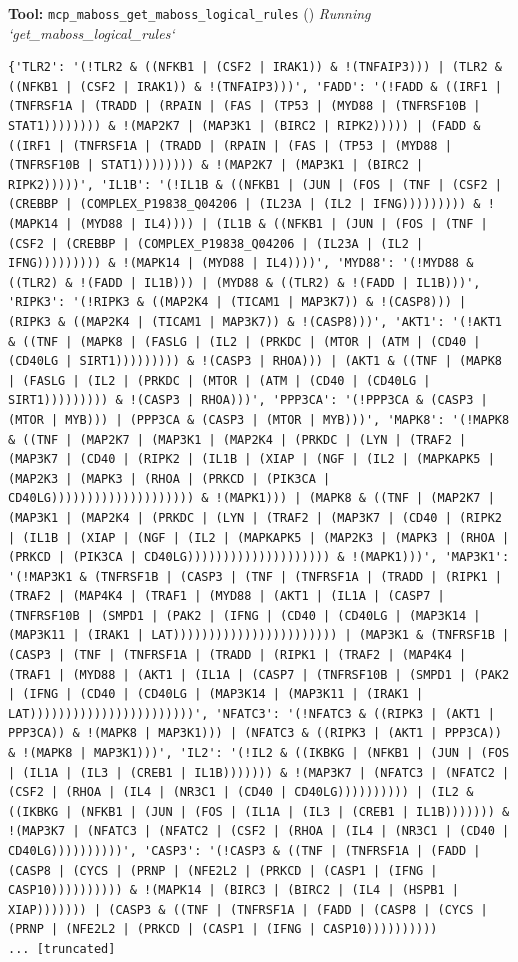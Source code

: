 \documentclass[11pt,a4paper]{article}
\begin{document}
\begin{toolokbox}
\textbf{Tool:} \texttt{mcp\_maboss\_get\_maboss\_logical\_rules} (\checkmark)
\textit{Running `get\_maboss\_logical\_rules`}
\begin{lstlisting}
{'TLR2': '(!TLR2 & ((NFKB1 | (CSF2 | IRAK1)) & !(TNFAIP3))) | (TLR2 & ((NFKB1 | (CSF2 | IRAK1)) & !(TNFAIP3)))', 'FADD': '(!FADD & ((IRF1 | (TNFRSF1A | (TRADD | (RPAIN | (FAS | (TP53 | (MYD88 | (TNFRSF10B | STAT1)))))))) & !(MAP2K7 | (MAP3K1 | (BIRC2 | RIPK2))))) | (FADD & ((IRF1 | (TNFRSF1A | (TRADD | (RPAIN | (FAS | (TP53 | (MYD88 | (TNFRSF10B | STAT1)))))))) & !(MAP2K7 | (MAP3K1 | (BIRC2 | RIPK2)))))', 'IL1B': '(!IL1B & ((NFKB1 | (JUN | (FOS | (TNF | (CSF2 | (CREBBP | (COMPLEX_P19838_Q04206 | (IL23A | (IL2 | IFNG))))))))) & !(MAPK14 | (MYD88 | IL4)))) | (IL1B & ((NFKB1 | (JUN | (FOS | (TNF | (CSF2 | (CREBBP | (COMPLEX_P19838_Q04206 | (IL23A | (IL2 | IFNG))))))))) & !(MAPK14 | (MYD88 | IL4))))', 'MYD88': '(!MYD88 & ((TLR2) & !(FADD | IL1B))) | (MYD88 & ((TLR2) & !(FADD | IL1B)))', 'RIPK3': '(!RIPK3 & ((MAP2K4 | (TICAM1 | MAP3K7)) & !(CASP8))) | (RIPK3 & ((MAP2K4 | (TICAM1 | MAP3K7)) & !(CASP8)))', 'AKT1': '(!AKT1 & ((TNF | (MAPK8 | (FASLG | (IL2 | (PRKDC | (MTOR | (ATM | (CD40 | (CD40LG | SIRT1))))))))) & !(CASP3 | RHOA))) | (AKT1 & ((TNF | (MAPK8 | (FASLG | (IL2 | (PRKDC | (MTOR | (ATM | (CD40 | (CD40LG | SIRT1))))))))) & !(CASP3 | RHOA)))', 'PPP3CA': '(!PPP3CA & (CASP3 | (MTOR | MYB))) | (PPP3CA & (CASP3 | (MTOR | MYB)))', 'MAPK8': '(!MAPK8 & ((TNF | (MAP2K7 | (MAP3K1 | (MAP2K4 | (PRKDC | (LYN | (TRAF2 | (MAP3K7 | (CD40 | (RIPK2 | (IL1B | (XIAP | (NGF | (IL2 | (MAPKAPK5 | (MAP2K3 | (MAPK3 | (RHOA | (PRKCD | (PIK3CA | CD40LG)))))))))))))))))))) & !(MAPK1))) | (MAPK8 & ((TNF | (MAP2K7 | (MAP3K1 | (MAP2K4 | (PRKDC | (LYN | (TRAF2 | (MAP3K7 | (CD40 | (RIPK2 | (IL1B | (XIAP | (NGF | (IL2 | (MAPKAPK5 | (MAP2K3 | (MAPK3 | (RHOA | (PRKCD | (PIK3CA | CD40LG)))))))))))))))))))) & !(MAPK1)))', 'MAP3K1': '(!MAP3K1 & (TNFRSF1B | (CASP3 | (TNF | (TNFRSF1A | (TRADD | (RIPK1 | (TRAF2 | (MAP4K4 | (TRAF1 | (MYD88 | (AKT1 | (IL1A | (CASP7 | (TNFRSF10B | (SMPD1 | (PAK2 | (IFNG | (CD40 | (CD40LG | (MAP3K14 | (MAP3K11 | (IRAK1 | LAT))))))))))))))))))))))) | (MAP3K1 & (TNFRSF1B | (CASP3 | (TNF | (TNFRSF1A | (TRADD | (RIPK1 | (TRAF2 | (MAP4K4 | (TRAF1 | (MYD88 | (AKT1 | (IL1A | (CASP7 | (TNFRSF10B | (SMPD1 | (PAK2 | (IFNG | (CD40 | (CD40LG | (MAP3K14 | (MAP3K11 | (IRAK1 | LAT)))))))))))))))))))))))', 'NFATC3': '(!NFATC3 & ((RIPK3 | (AKT1 | PPP3CA)) & !(MAPK8 | MAP3K1))) | (NFATC3 & ((RIPK3 | (AKT1 | PPP3CA)) & !(MAPK8 | MAP3K1)))', 'IL2': '(!IL2 & ((IKBKG | (NFKB1 | (JUN | (FOS | (IL1A | (IL3 | (CREB1 | IL1B))))))) & !(MAP3K7 | (NFATC3 | (NFATC2 | (CSF2 | (RHOA | (IL4 | (NR3C1 | (CD40 | CD40LG)))))))))) | (IL2 & ((IKBKG | (NFKB1 | (JUN | (FOS | (IL1A | (IL3 | (CREB1 | IL1B))))))) & !(MAP3K7 | (NFATC3 | (NFATC2 | (CSF2 | (RHOA | (IL4 | (NR3C1 | (CD40 | CD40LG))))))))))', 'CASP3': '(!CASP3 & ((TNF | (TNFRSF1A | (FADD | (CASP8 | (CYCS | (PRNP | (NFE2L2 | (PRKCD | (CASP1 | (IFNG | CASP10)))))))))) & !(MAPK14 | (BIRC3 | (BIRC2 | (IL4 | (HSPB1 | XIAP))))))) | (CASP3 & ((TNF | (TNFRSF1A | (FADD | (CASP8 | (CYCS | (PRNP | (NFE2L2 | (PRKCD | (CASP1 | (IFNG | CASP10))))))))))
... [truncated]
\end{lstlisting}
\end{toolokbox}
\end{document}
